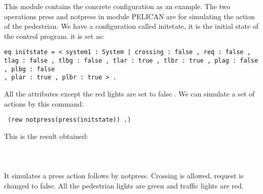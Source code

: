 \documentclass{article}
\begin{document}
This module contains the concrete configuration as an example.
The two operations press and notpress in module PELICAN are for simulating the action of the pedestrian. We have a configuration called initstate, it is the initial state of the control program. it is set as:
\begin{verbatim}
eq initstate = < system1 : System | crossing : false , req : false , 
tlag : false , tlbg : false , tlar : true , tlbr : true , plag : false , plbg : false 
, plar : true , plbr : true > .
\end{verbatim}

All the attributes except the red lights are set to false .
We can simulate a set of actions by this command:
\begin{verbatim} (rew notpress(press(initstate)) .)\end{verbatim}

This is the result obtained:\\\\
 \\\\

It simulates a press action follows by notpress. Crossing is allowed, request is changed to false. All the pedestrian lights are green and traffic lights are red.
\newpage
\end{document}
